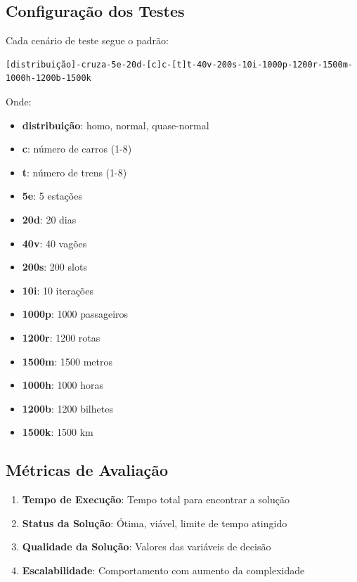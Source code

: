 \documentclass[12pt,a4paper]{article}
\begin{document}
\subsection{Configuração dos Testes}

Cada cenário de teste segue o padrão:
\begin{verbatim}
[distribuição]-cruza-5e-20d-[c]c-[t]t-40v-200s-10i-1000p-1200r-1500m-1000h-1200b-1500k
\end{verbatim}

Onde:
\begin{itemize}
    \item \textbf{distribuição}: homo, normal, quase-normal
    \item \textbf{c}: número de carros (1-8)
    \item \textbf{t}: número de trens (1-8)
    \item \textbf{5e}: 5 estações
    \item \textbf{20d}: 20 dias
    \item \textbf{40v}: 40 vagões
    \item \textbf{200s}: 200 slots
    \item \textbf{10i}: 10 iterações
    \item \textbf{1000p}: 1000 passageiros
    \item \textbf{1200r}: 1200 rotas
    \item \textbf{1500m}: 1500 metros
    \item \textbf{1000h}: 1000 horas
    \item \textbf{1200b}: 1200 bilhetes
    \item \textbf{1500k}: 1500 km
\end{itemize}

\subsection{Métricas de Avaliação}

\begin{enumerate}
    \item \textbf{Tempo de Execução}: Tempo total para encontrar a solução
    \item \textbf{Status da Solução}: Ótima, viável, limite de tempo atingido
    \item \textbf{Qualidade da Solução}: Valores das variáveis de decisão
    \item \textbf{Escalabilidade}: Comportamento com aumento da complexidade
\end{enumerate}
\end{document}
